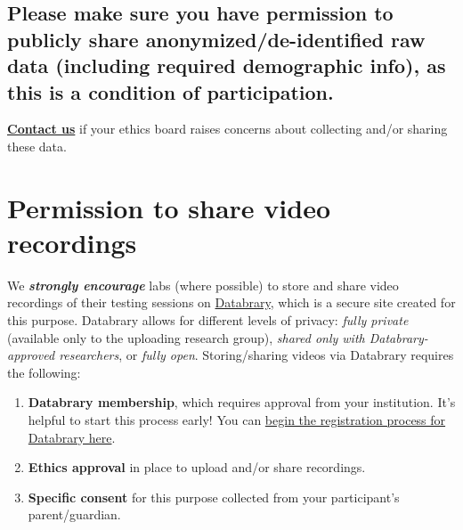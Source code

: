 \documentclass[
  letterpaper,
  DIV=11,
  numbers=noendperiod,
  oneside]{scrreprt}
\providecommand{\tightlist}{%
  \setlength{\itemsep}{0pt}\setlength{\parskip}{0pt}}
\begin{document}
\begin{tcolorbox}[enhanced jigsaw, coltitle=black, colframe=quarto-callout-important-color-frame, titlerule=0mm, colback=white, arc=.35mm, toprule=.15mm, left=2mm, colbacktitle=quarto-callout-important-color!10!white, opacityback=0, bottomtitle=1mm, title=\textcolor{quarto-callout-important-color}{\faExclamation}\hspace{0.5em}{Data sharing}, breakable, rightrule=.15mm, opacitybacktitle=0.6, toptitle=1mm, leftrule=.75mm, bottomrule=.15mm]

\subsection*{Please make sure you have permission to publicly share
anonymized/de-identified raw data (including required demographic info),
as this is a condition of
participation.}\label{please-make-sure-you-have-permission-to-publicly-share-anonymizedde-identified-raw-data-including-required-demographic-info-as-this-is-a-condition-of-participation.}

\href{mailto:mb5@manybabies.org}{\textbf{Contact us}} if your ethics
board raises concerns about collecting and/or sharing these data.

\end{tcolorbox}

\section{Permission to share video
recordings}\label{permission-to-share-video-recordings}

We \textbf{\emph{strongly encourage}} labs (where possible) to store and
share video recordings of their testing sessions on
\href{https://nyu.databrary.org/}{Databrary}, which is a secure site
created for this purpose. Databrary allows for different levels of
privacy: \emph{fully private} (available only to the uploading research
group), \emph{shared only with Databrary-approved researchers}, or
\emph{fully open}. Storing/sharing videos via Databrary requires the
following:

\begin{enumerate}
\def\labelenumi{(\arabic{enumi})}
\setcounter{enumi}{16}
\tightlist
\item
  \textbf{Databrary membership}, which requires approval from your
  institution. It's helpful to start this process early! You can
  \href{https://nyu.databrary.org/user/register?page=create}{begin the
  registration process for Databrary here}.
\item
  \textbf{Ethics approval} in place to upload and/or share recordings.
\item
  \textbf{Specific consent} for this purpose collected from your
  participant's parent/guardian.
\end{enumerate}
\end{document}

